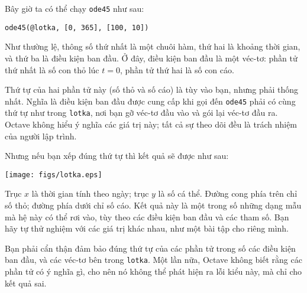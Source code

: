 \documentclass[12pt]{book}
\begin{document}
Bây giờ ta có thể chạy {\tt ode45} như sau:

\begin{verbatim}
ode45(@lotka, [0, 365], [100, 10])
\end{verbatim}
%
Như thường lệ, thông số thứ nhất là một chuôi hàm, thứ hai là 
khoảng thời gian, và thứ ba là điều kiện ban đầu. Ở đây, điều kiện
ban đầu là một véc-tơ: phần tử thứ nhất là số con thỏ lúc 
$t=0$, phần tử thứ hai là số con cáo.

Thứ tự của hai phần tử này (số thỏ và số cáo) là tùy vào bạn, nhưng
phải thống nhất. Nghĩa là điều kiện ban đầu được cung cấp khi gọi
đến {\tt ode45} phải có cùng thứ tự như trong {\tt lotka}, 
nơi bạn gỡ véc-tơ đầu vào và gói lại véc-tơ đầu ra. 
Octave không hiểu ý nghĩa các giá trị này; tất cả sự theo dõi đều là
trách nhiệm của người lập trình.

Nhưng nếu bạn xếp đúng thứ tự thì kết quả sẽ được như sau:

\centerline{\texttt{[image: figs/lotka.eps]}}

Trục $x$ là thời gian tính theo ngày; trục $y$ là số cá thể. 
Đường cong phía trên chỉ số thỏ; đường phía dưới chỉ số cáo.
Kết quả này là một trong số những dạng mẫu mà hệ này
có thể rơi vào, tùy theo các điều kiện ban đầu và các tham số.
Bạn hãy tự thử nghiệm với các giá trị khác nhau, như một
bài tập cho riêng mình.


%
%
%

Bạn phải cẩn thận đảm bảo đúng thứ tự của các phần tử
trong số các điều kiện ban đầu, và các véc-tơ bên trong {\tt lotka}. 
Một lần nữa, Octave không biết rằng các phần tử có ý nghĩa gì, cho
nên nó không thể phát hiện ra lỗi kiểu này, mà chỉ cho kết quả sai.
\end{document}
